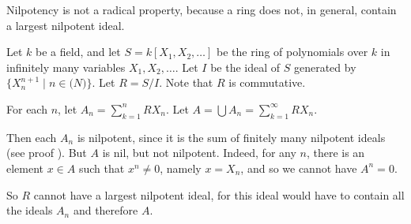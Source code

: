 \documentclass[12pt]{article}
\begin{document}
Nilpotency is not a radical property, because a ring does not, in general, contain a largest nilpotent ideal.

Let $k$ be a field, and let $S = k[X_1, X_2, \dotsc]$ be the ring of polynomials over $k$ in infinitely many variables $X_1, X_2, \dots$.
Let $I$ be the ideal of $S$ generated by $\{X_n^{n+1} \mid n \in \mathbb(N)\}$.
Let $R = S/I$.  Note that $R$ is commutative.

For each $n$, let $A_n = \sum_{k=1}^n RX_n$.
Let $A = \bigcup A_n = \sum_{k = 1}^\infty RX_n$.

Then each $A_n$ is nilpotent, since it is the sum of finitely many nilpotent ideals (see proof ).  But $A$ is nil, but not nilpotent.  Indeed, for any $n$, there is an element $x \in A$ such that $x^n \neq 0$, namely $x = X_n$, and so we cannot have $A^n = 0$.

So $R$ cannot have a largest nilpotent ideal, for this ideal would have to contain all the ideals $A_n$ and therefore $A$.
\end{document}
